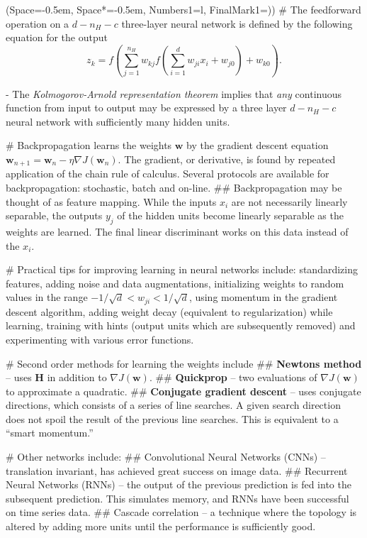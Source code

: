 \documentclass[12pt, a4paper]{article}
\newcommand{\listSpace}{-0.5em}%
\newcommand{\vect}[1]{\bm{#1}}
\begin{document}
\begin{easylist}[itemize]
\ListProperties(Space=\listSpace, Space*=\listSpace, Numbers1=l, FinalMark1={)})
# The feedforward operation on a $d - n_H -c$ three-layer neural network is defined by the following equation for the output
\begin{equation*}
	z_k = f \left( \sum_{j=1}^{n_H} w_{kj} f \left( \sum_{i=1}^{d} w_{ji} x_i + w_{j0} \right) + w_{k0} \right).
\end{equation*}

- The \emph{Kolmogorov-Arnold representation theorem} implies that \emph{any} continuous function from input to output may be expressed by a three layer $d - n_H - c$ neural network with sufficiently many hidden units.

# Backpropagation learns the weights $\vect{w}$ by the gradient descent equation $\vect{w}_{n+1} = \vect{w}_{n} - \eta \nabla J(\vect{w}_{n})$. 
The gradient, or derivative, is found by repeated application of the chain rule of calculus.
Several protocols are available for backpropagation: stochastic, batch and on-line.
## Backpropagation may be thought of as feature mapping.
While the inputs $x_i$ are not necessarily linearly separable, the outputs $y_j$ of the hidden units become linearly separable as the weights are learned.
The final linear discriminant works on this data instead of the $x_i$.

# Practical tips for improving learning in neural networks include:
standardizing features, 
adding noise and data augmentations, 
initializing weights to random values in the range $-1 / \sqrt{d} < w_{ji} < 1 / \sqrt{d}$, 
using momentum in the gradient descent algorithm, 
adding weight decay (equivalent to regularization) while learning, 
training with hints (output units which are subsequently removed) and 
experimenting with various error functions.

# Second order methods for learning the weights include
## \textbf{Newtons method} -- uses $\vect{H}$ in addition to $\nabla J(\vect{w})$.
## \textbf{Quickprop} -- two evaluations of $\nabla J(\vect{w})$ to approximate a quadratic.
## \textbf{Conjugate gradient descent} -- uses conjugate directions, which consists of a series of line searches. 
A given search direction does not spoil the result of the previous line searches.
This is equivalent to a ``smart momentum.''

# Other networks include:
## Convolutional Neural Networks (CNNs) -- translation invariant, has achieved great success on image data.
## Recurrent Neural Networks (RNNs) -- the output of the previous prediction is fed into the subsequent prediction. 
This simulates memory, and RNNs have been successful on time series data.
## Cascade correlation -- a technique where the topology is altered by adding more units until the performance is sufficiently good.
\end{easylist}
\end{document}
